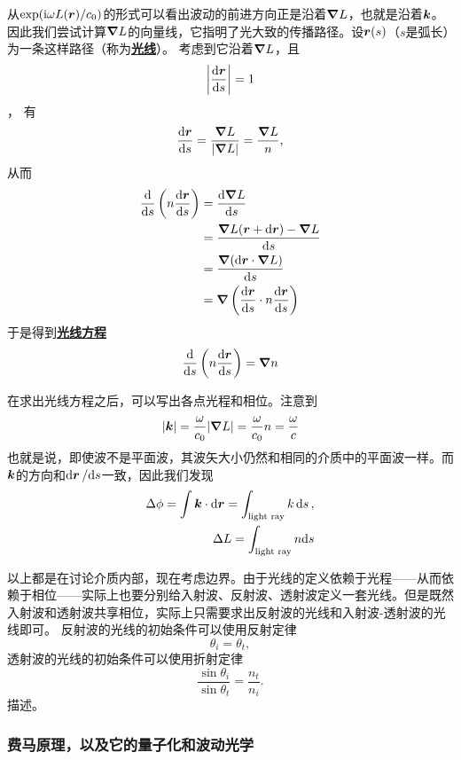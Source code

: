 \documentclass[UTF8, a4paper]{ctexart}
\newcommand*{\ii}{\mathrm{i}}
\newcommand*{\concept}[1]{\underline{\textbf{#1}}}
\begin{document}
从$\exp (\ii \omega L(\vb*{r}) / c_0)$的形式可以看出波动的前进方向正是沿着$\grad{L}$，也就是沿着$\vb*{k}$。
因此我们尝试计算$\grad{L}$的向量线，它指明了光大致的传播路径。设$\vb*{r}(s)$（$s$是弧长）为一条这样路径（称为\concept{光线}）。
考虑到它沿着$\grad{L}$，且
\[
    \abs{\dv{\vb*{r}}{s}} = 1
\]，
有
\[
    \dv{\vb*{r}}{s} = \frac{\grad{L}}{\abs{\grad{L}}} = \frac{\grad{L}}{n},
\]
从而
\[
    \begin{aligned}
        \dv{s}\left(n \dv{\vb*{r}}{s}\right) &= \dv{\grad{L}}{s} \\
        &= \frac{\grad{L}(\vb*{r} + \dd \vb*{r}) - \grad{L}}{\dd s} \\
        &= \frac{\grad{(\dd \vb*{r} \cdot \grad{L})}}{\dd s} \\
        &= \grad{\left( \dv{\vb*{r}}{s} \cdot n \dv{\vb*{r}}{s} \right)}
    \end{aligned}
\]
于是得到\concept{光线方程}
\begin{equation}
    \dv{s} \left( n \dv{\vb*{r}}{s} \right) = \grad{n}
    \label{eq:light-ray}
\end{equation}

在求出光线方程之后，可以写出各点光程和相位。注意到
\[
    \abs{\vb*{k}} = \frac{\omega}{c_0} \abs{\grad{L}} = \frac{\omega}{c_0} n = \frac{\omega}{c}
\]
也就是说，即使波不是平面波，其波矢大小仍然和相同的介质中的平面波一样。而$\vb*{k}$的方向和$\dd{\vb*{r}} / \dd s$一致，因此我们发现
\begin{equation}
    \begin{aligned}
        \Delta \phi = \int \vb*{k} \cdot \dd{\vb*{r}} = \int_\text{light ray} k \dd{s}, \\
        \Delta L = \int_\text{light ray} n \dd s
    \end{aligned}
    \label{eq:light-ray-and-phrase}
\end{equation}

以上都是在讨论介质内部，现在考虑边界。由于光线的定义依赖于光程——从而依赖于相位——实际上也要分别给入射波、反射波、透射波定义一套光线。但是既然入射波和透射波共享相位，实际上只需要求出反射波的光线和入射波-透射波的光线即可。
反射波的光线的初始条件可以使用反射定律
\[
    \theta_i = \theta_t,
\]
透射波的光线的初始条件可以使用折射定律
\[
    \frac{\sin \theta_i}{\sin \theta_t} = \frac{n_t}{n_i}.
\]
描述。

\subsubsection{费马原理，以及它的量子化和波动光学}
\end{document}
